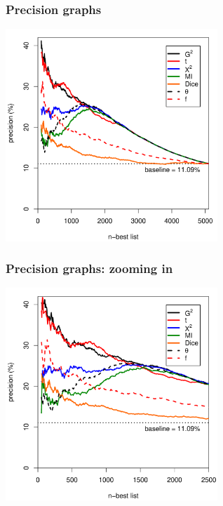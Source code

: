 \documentclass[t]{beamer} %
\begin{document}
\begin{frame}
  \frametitle{Precision graphs}

  \begin{center}
    \includegraphics[width=8cm]{img/mwe_eval_1}
  \end{center}
\end{frame}

\begin{frame}
  \frametitle{Precision graphs: zooming in}

  \begin{center}
    \includegraphics[width=8cm]{img/mwe_eval_2}
  \end{center}
\end{frame}
\end{document}
